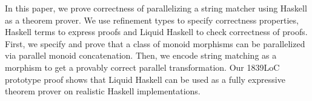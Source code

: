In this paper, we prove correctness of parallelizing a string matcher
using Haskell as a theorem prover.
%
We use refinement types to specify correctness properties,
Haskell terms to express proofs and Liquid Haskell to
check correctness of proofs.
%
First, we specify and prove that a class of monoid morphisms
can be parallelized via parallel monoid concatenation.
%
Then, we encode string matching as a morphism
to get a provably correct parallel transformation.
%
Our 1839LoC prototype proof shows that
Liquid Haskell can be used as a fully expressive
theorem prover on realistic Haskell implementations.
